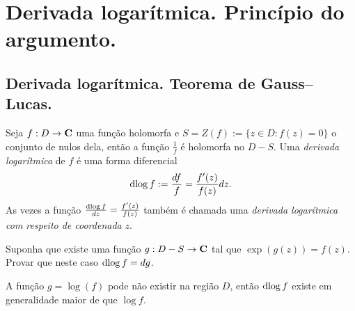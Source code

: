 \section{Derivada logarítmica. Princípio do argumento.}

\subsection{Derivada logarítmica. Teorema de Gauss--Lucas.}

\begin{defin}
Seja $f : D \to \mathbf{C}$ uma função holomorfa
e $S = Z(f) := \{ z\in D: f(z) = 0 \}$ o conjunto de nulos dela,
então a função $\frac{1}{f}$ é holomorfa no $D-S$.
Uma \emph{derivada logarítmica} de $f$ é uma forma diferencial
\begin{equation}
\operatorname{dlog} f := \frac{df}{f} = \frac{f'(z)}{f(z)} dz.
\end{equation}
As vezes a função $\frac{\operatorname{dlog} f}{dz} = \frac{f'(z)}{f(z)}$ também é chamada uma \emph{derivada logarítmica}
\emph{com respeito de coordenada} $z$.
\end{defin}

\begin{problema}
Suponha que existe uma função $g: D-S\to\mathbf{C}$ tal que $\exp(g(z)) = f(z)$.
Provar que neste caso $\operatorname{dlog} f = dg$.
\end{problema}

A função $g=\log(f)$ pode não existir na região $D$, então $\operatorname{dlog} f$ existe em generalidade
maior de que $\log f$.

